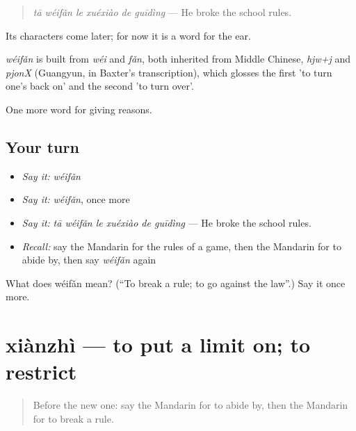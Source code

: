 \begin{quote}
\emph{tā wéifǎn le xuéxiào de guīdìng} — He broke the school rules.
\end{quote}

Its characters come later; for now it is a word for the ear.

\begin{cousinweb}
\emph{wéifǎn} is built from \emph{wéi} and \emph{fǎn}, both inherited from Middle Chinese, \emph{hjw+j} and \emph{pjonX} (Guangyun, in Baxter's transcription), which glosses the first 'to turn one's back on' and the second 'to turn over'.
\end{cousinweb}

\begin{grammarlens}[title={What you've built}]
One more word for giving reasons.
\end{grammarlens}

\subsection*{Your turn}
\begin{itemize}
\raggedright
  \item \emph{Say it:} \emph{wéifǎn}
  \item \emph{Say it:} \emph{wéifǎn}, once more
  \item \emph{Say it:} \emph{tā wéifǎn le xuéxiào de guīdìng} — He broke the school rules.
  \item \emph{Recall:} say the Mandarin for the rules of a game, then the Mandarin for to abide by, then say \emph{wéifǎn} again
\end{itemize}

\begin{tcolorbox}[breakable,colback=teal!4,colframe=teal!35!black,title={Before you move on}]
What does wéifǎn mean? (\textquotedblleft{}To break a rule; to go against the law\textquotedblright{}.) Say it once more.
\end{tcolorbox}
\section[xiànzhì]{xiànzhì — to put a limit on; to restrict}

\label{lesson:ZH-C359-xianzhi}



\begin{quote}
Before the new one: say the Mandarin for to abide by, then the Mandarin for to break a rule.
\end{quote}

